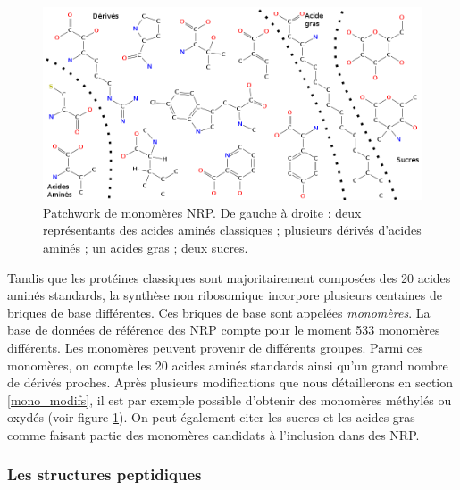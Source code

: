 \begin{figure}[h!]
  \begin{center}
    \includegraphics[width=450px]{Figures/bio/Intro/monos/monos.png}
    \caption{\label{monomers_example}Patchwork de monomères NRP.
    De gauche à droite : deux représentants des acides aminés classiques ; plusieurs dérivés d'acides aminés ; un acides gras ; deux sucres.}
  \end{center}
\end{figure}

Tandis que les protéines classiques sont majoritairement composées des 20 acides aminés standards, la synthèse non ribosomique incorpore plusieurs centaines de briques de base différentes.
Ces briques de base sont appelées {\em monomères}.
La base de données de référence des NRP compte pour le moment 533 monomères différents.
Les monomères peuvent provenir de différents groupes.
Parmi ces monomères, on compte les 20 acides aminés standards ainsi qu'un grand nombre de dérivés proches.
Après plusieurs modifications que nous détaillerons en section \ref{mono_modifs}, il est par exemple possible d'obtenir des monomères méthylés ou oxydés (voir figure \ref{monomers_example}).
On peut également citer les sucres et les acides gras comme faisant partie des monomères candidats à l'inclusion dans des NRP.


\subsubsection{Les structures peptidiques}

